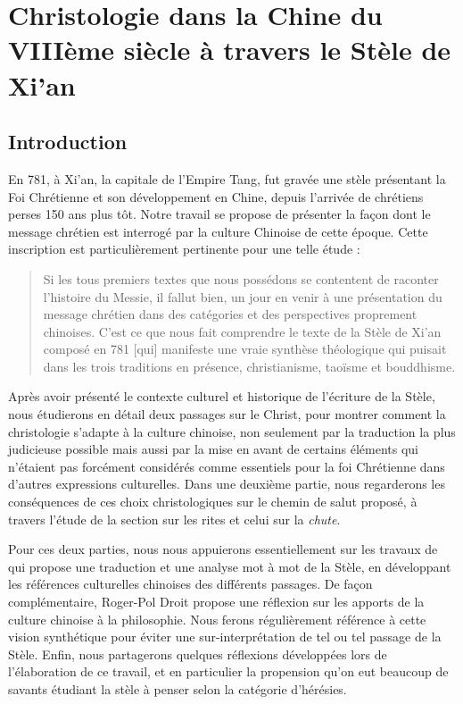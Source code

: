 \chapter{Christologie dans la Chine du VIIIème siècle à travers le Stèle de Xi'an}
\label{ch:christologieChine}
\section{Introduction}

En 781, à Xi'an, la capitale de l'Empire Tang, fut gravée une stèle présentant la Foi Chrétienne et son développement en Chine, depuis l'arrivée de chrétiens perses 150 ans plus tôt. Notre travail se propose de présenter la façon dont le message chrétien est interrogé par la culture Chinoise de cette époque. Cette inscription est particulièrement pertinente pour une telle étude : 

\begin{quote}
Si les tous premiers textes que nous possédons se contentent de raconter l'histoire du Messie, il fallut bien, un jour en venir à une présentation du message chrétien dans des catégories et des perspectives proprement chinoises. C'est ce que nous fait comprendre le texte de la Stèle de Xi'an composé en 781 [qui] manifeste une vraie synthèse théologique qui puisait dans les trois traditions en présence, christianisme, taoïsme et bouddhisme. \cite[p.~150]{Raguin:JesusMessieXian} 
\end{quote}

Après avoir présenté le contexte culturel et historique de l'écriture de la Stèle, nous étudierons en détail deux passages sur le Christ, pour montrer comment la christologie s'adapte à la culture chinoise, non seulement par la traduction la plus judicieuse possible mais aussi par la mise en avant de certains éléments qui n'étaient pas forcément considérés comme essentiels pour la foi Chrétienne dans d'autres expressions culturelles.
Dans une deuxième partie, nous regarderons les conséquences de ces choix christologiques sur le chemin de salut proposé, à travers l'étude de la section sur les rites et celui sur la \textit{chute}. 

Pour ces deux parties, nous nous appuierons essentiellement sur les travaux de \cite{Havret:stelechretienne} qui propose une traduction et une analyse mot à mot de la Stèle, en développant les références culturelles chinoises des différents passages. De façon complémentaire, Roger-Pol Droit \citep{PolDroit:voyage} propose une réflexion sur les apports de la culture chinoise à la philosophie. Nous ferons régulièrement référence à cette vision synthétique pour éviter une sur-interprétation de tel ou tel passage de la Stèle. 
Enfin, nous partagerons quelques réflexions développées lors de l'élaboration de ce travail, et en particulier la propension qu'on eut beaucoup de savants étudiant la stèle à penser selon la catégorie d'hérésies.


